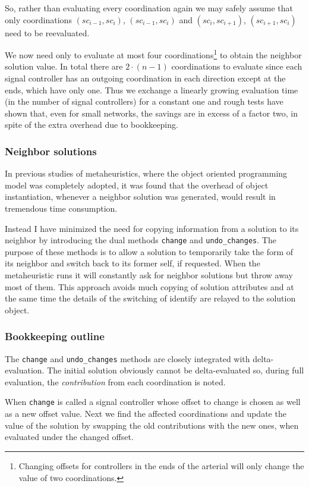 So, rather than evaluating every coordination again we may safely assume that only coordinations $(sc_{i-1},sc_{i})$, $(sc_{i-1},sc_{i})$ and $(sc_{i},sc_{i+1})$, $(sc_{i+1},sc_{i})$ need to be reevaluated. 

We now need only to evaluate at most four coordinations\footnote{Changing offsets for controllers in the ends of the arterial will only change the value of two coordinations.} to obtain the neighbor solution value. In total there are $2\cdot (n-1)$ coordinations to evaluate since each signal controller has an outgoing coordination in each direction except at the ends, which have only one. Thus we exchange a linearly growing evaluation time (in the number of signal controllers) for a constant one and rough tests have shown that, even for small networks, the savings are in excess of a factor two, in spite of the extra overhead due to bookkeeping.

\subsubsection{Neighbor solutions}
In previous studies of metaheuristics, where the object oriented programming model was completely adopted, it was found that the overhead of object instantiation, whenever a neighbor solution was generated, would result in tremendous time consumption. 

Instead I have minimized the need for copying information from a solution to its neighbor by introducing the dual methods \verb|change| and \verb|undo_changes|. The purpose of these methods is to allow a solution to temporarily take the form of its neighbor and switch back to its former self, if requested. 
When the metaheuristic runs it will constantly ask for neighbor solutions but throw away most of them. This approach avoids much copying of solution attributes and at the same time the details of the switching of identify are relayed to the solution object.

\subsubsection{Bookkeeping outline}
The \verb|change| and \verb|undo_changes| methods are closely integrated with delta-evaluation. The initial solution obviously cannot be delta-evaluated so, during full evaluation, the \textit{contribution} from each coordination is noted. 

When \verb|change| is called a signal controller whose offset to change is chosen as well as a new offset value. Next we find the affected coordinations and update the value of the solution by swapping the old contributions with the new ones, when evaluated under the changed offset.

